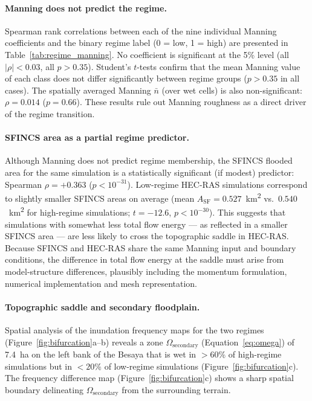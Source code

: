 \documentclass[review,12pt]{elsarticle}
\newcommand{\sfincs}{\textsc{SFINCS}}
\newcommand{\hecras}{\textsc{HEC-RAS}}
\begin{document}
\paragraph{Manning does not predict the regime.}
Spearman rank correlations between each of the nine individual Manning
coefficients and the binary regime label (0 = low, 1 = high) are presented
in Table~\ref{tab:regime_manning}.
No coefficient is significant at the 5\% level (all $|\rho| < 0.03$,
all $p > 0.35$).
Student's $t$-tests confirm that the mean Manning value of each class does
not differ significantly between regime groups ($p > 0.35$ in all cases).
The spatially averaged Manning $\bar{n}$ (over wet cells) is also
non-significant: $\rho = 0.014$ ($p = 0.66$).
These results rule out Manning roughness as a direct driver of
the regime transition.

\paragraph{SFINCS area as a partial regime predictor.}
Although Manning does not predict regime membership, the \sfincs{} flooded
area for the same simulation is a statistically significant (if modest)
predictor: Spearman $\rho = +0.363$ ($p < 10^{-31}$).
Low-regime \hecras{} simulations correspond to slightly smaller \sfincs{}
areas on average (mean $A_{\mathrm{SF}} = 0.527$~km\textsuperscript{2} vs.\
$0.540$~km\textsuperscript{2} for high-regime simulations;
$t = -12.6$, $p < 10^{-30}$).
This suggests that simulations with somewhat less total flow energy ---
as reflected in a smaller \sfincs{} area --- are less likely to cross
the topographic saddle in \hecras{}.
Because \sfincs{} and \hecras{} share the same Manning input and boundary
conditions, the difference in total flow energy at the saddle must arise from
model-structure differences, plausibly including the momentum formulation,
numerical implementation and mesh representation.

\paragraph{Topographic saddle and secondary floodplain.}
Spatial analysis of the inundation frequency maps for the two regimes
(Figure~\ref{fig:bifurcation}a--b) reveals a zone $\Omega_{\mathrm{secondary}}$
(Equation~\ref{eq:omega}) of 7.4~ha on the left bank of the Besaya that is
wet in $> 60$\% of high-regime simulations but in $< 20$\% of low-regime
simulations (Figure~\ref{fig:bifurcation}c).
The frequency difference map (Figure~\ref{fig:bifurcation}c) shows a sharp
spatial boundary delineating $\Omega_{\mathrm{secondary}}$ from the
surrounding terrain.
\end{document}
